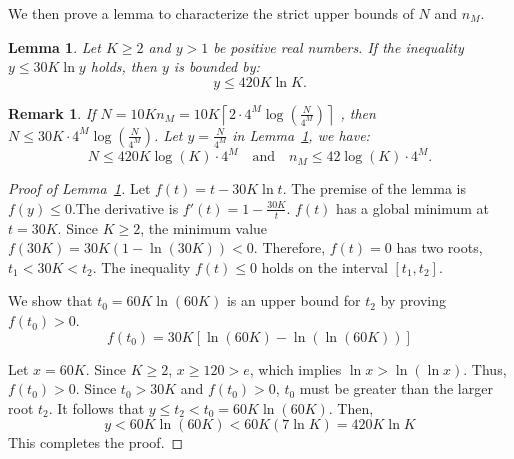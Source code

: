 \documentclass[11pt]{article}
\newtheorem{lemma}{Lemma}
\newtheorem{note}{Remark}
\begin{document}
We then prove a lemma to characterize the strict upper bounds of \(N\) and \(n_M\).
\begin{lemma}
\label{Upper bound of N}
Let $K \ge 2$ and $y > 1$ be positive real numbers. If the inequality $y \le 30K \ln y$ holds, then $y$ is bounded by:
$$y \le 420K \ln K.$$
\end{lemma}

\begin{note}
\label{Remark 8}
If $N=10Kn_{M}=10 K \left\lceil 2\cdot 4^M\log\left(\frac{N}{4^M}\right) \right\rceil$ , then  $N\leq 30K\cdot4^M\log\left(\frac{N}{4^M}\right)$. Let $y=\frac{N}{4^M}$ in Lemma~\ref{Upper bound of N}, we have:
$$N\leq420K\log(K)\cdot 4^M  \quad\text{and} \quad n_M\leq42\log(K)\cdot 4^M . $$
\end{note}

\begin{proof}[Proof of Lemma~\ref{Upper bound of N}]
    Let $f(t) = t - 30K \ln t$. The premise of the lemma is $f(y) \le 0$.The derivative is $f'(t) = 1 - \frac{30K}{t}$. $f(t)$ has a global minimum at $t = 30K$.
    Since $K \ge 2$, the minimum value $f(30K) = 30K(1 - \ln(30K)) < 0$.
    Therefore, $f(t)=0$ has two roots, $t_1 < 30K < t_2$. The inequality $f(t) \le 0$ holds on the interval $[t_1, t_2]$. 

    We show that $t_0 = 60K \ln(60K)$ is an upper bound for $t_2$ by proving $f(t_0) > 0$.
 $$ f(t_0) = 30K[\ln(60K) - \ln(\ln(60K))]$$
   
    Let $x = 60K$. Since $K \ge 2$, $x \ge 120 > e$, which implies $\ln x > \ln(\ln x)$.
    Thus, $f(t_0) > 0$.
    Since $t_0 > 30K$ and $f(t_0) > 0$, $t_0$ must be greater than the larger root $t_2$.
    It follows that $y \le t_2 < t_0 = 60K \ln(60K)$. Then, 
    $$
    y < 60K \ln(60K) < 60K (7 \ln K) = 420K \ln K
    $$
This completes the proof.
\end{proof}
\end{document}
